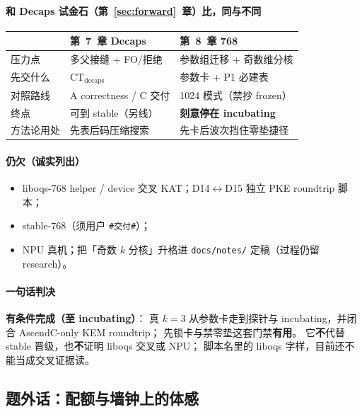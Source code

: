 \documentclass[UTF8,a4paper,11pt]{ctexart}
\theoremstyle{definition}
\theoremstyle{plain}
\theoremstyle{remark}
\numberwithin{figure}{section}
\numberwithin{table}{section}
\begin{document}
\paragraph{和 Decaps 试金石（第~\ref{sec:forward}~章）比，同与不同}
\begin{center}
\small
\begin{tabular}{@{}L{3cm}L{5.5cm}L{5.5cm}@{}}
  \toprule
  & 第~7~章 Decaps & 第~8~章 768 \\
  \midrule
  压力点 & 多父接缝 + FO/拒绝 & 参数组迁移 + 奇数维分核 \\
  先交什么 & $\mathrm{CT}_{\mathrm{decaps}}$ & 参数卡 + P1 必建表 \\
  对照路线 & A correctness / C 交付 & 1024 模式（禁抄 frozen） \\
  终点 & 可到 stable（另线） & \textbf{刻意停在 incubating} \\
  方法论用处 & 先表后码压缩搜索 & 先卡后波次挡住零垫捷径 \\
  \bottomrule
\end{tabular}
\end{center}

\paragraph{仍欠（诚实列出）}
\begin{itemize}
  \item liboqs-768 helper / device 交叉 KAT；D14$\leftrightarrow$D15 独立 PKE roundtrip 脚本；
  \item stable-768（须用户 \texttt{\#交付\#}）；
  \item NPU 真机；把「奇数 $k$ 分核」升格进 \texttt{docs/notes/} 定稿（过程仍留 research）。
\end{itemize}

\paragraph{一句话判决}
\textbf{有条件完成（至 incubating）}：
真 $k{=}3$ 从参数卡走到探针与 incubating，并闭合 AscendC-only KEM roundtrip；
先锁卡与禁零垫这套门禁\textbf{有用}。
它\textbf{不}代替 stable 晋级，也\textbf{不}证明 liboqs 交叉或 NPU；
脚本名里的 liboqs 字样，目前还不能当成交叉证据读。

\subsection{题外话：配额与墙钟上的体感}
\label{sec:mlkem768-aside}
\end{document}
